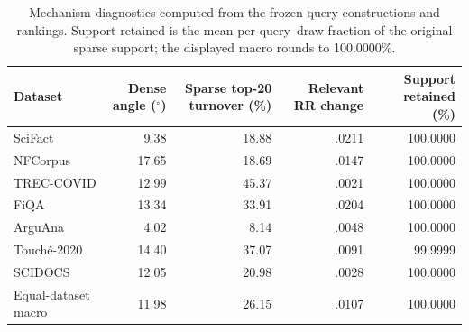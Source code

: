 \begin{table}[!t]
\centering
\small
\setlength{\tabcolsep}{5.0pt}
\begin{tabular}{lrrrr}
\toprule
Dataset & Dense angle ($^\circ$) & Sparse top-20 turnover (\%) & Relevant RR change & Support retained (\%) \\
\midrule
SciFact        &  9.38 & 18.88 & .0211 & 100.0000 \\
NFCorpus       & 17.65 & 18.69 & .0147 & 100.0000 \\
TREC-COVID     & 12.99 & 45.37 & .0021 & 100.0000 \\
FiQA           & 13.34 & 33.91 & .0204 & 100.0000 \\
ArguAna        &  4.02 &  8.14 & .0048 & 100.0000 \\
Touch\'e-2020 & 14.40 & 37.07 & .0091 &  99.9999 \\
SCIDOCS        & 12.05 & 20.98 & .0028 & 100.0000 \\
\midrule
Equal-dataset macro & 11.98 & 26.15 & .0107 & 100.0000 \\
\bottomrule
\end{tabular}
\caption{Mechanism diagnostics computed from the frozen query constructions
and rankings. Support retained is the mean per-query--draw fraction of the
original sparse support; the displayed macro rounds to 100.0000\%.}
\label{tab:mechanism-diagnostics}
\end{table}